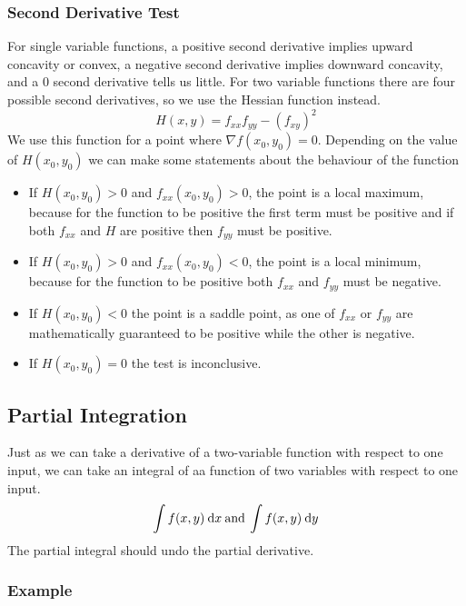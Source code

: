 \documentclass[12pt]{report}
\begin{document}
\begin{flushleft}
\subsubsection*{Second Derivative Test}

For single variable functions, a positive second derivative implies upward
concavity or convex, a negative second derivative implies downward concavity,
and a \(0\) second derivative tells us little. For two variable functions there
are four possible second derivatives, so we use the Hessian function instead.
\[H(x, y) = f_{xx}f_{yy} - (f_{xy})^2\]
We use this function for a point where \(\nabla f(x_0, y_0) = 0\). Depending
on the value of \(H(x_0, y_0)\) we can make some statements about the behaviour
of the function

\begin{itemize}
    \item If \(H(x_0, y_0) > 0\) and \(f_{xx}(x_0, y_0) > 0\), the point is a
        local maximum, because for the
        function to be positive the first term must be positive and if both
        \(f_{xx}\) and \(H\) are positive then \(f_{yy}\) must be positive.
    \item If \(H(x_0, y_0) > 0\) and \(f_{xx}(x_0, y_0) < 0\), the point is a
        local minimum, because for the function to be positive both \(f_{xx}\)
        and \(f_{yy}\) must be negative.
    \item If \(H(x_0, y_0) < 0\) the point is a saddle point, as one of
        \(f_{xx}\) or \(f_{yy}\) are mathematically guaranteed to be positive
        while the other is negative.
    \item If \(H(x_0, y_0) = 0\) the test is inconclusive.
\end{itemize}

\subsection*{Partial Integration}

Just as we can take a derivative of a two-variable function with respect to one
input, we can take an integral of aa function of two variables with respect to
one input.
\[\int f(x, y) \:\mathrm{d}x\:\mathrm{and}\: \int f(x, y) \:\mathrm{d}y\]
The partial integral should undo the partial derivative.

\subsubsection*{Example}


\end{flushleft}
\end{document}
